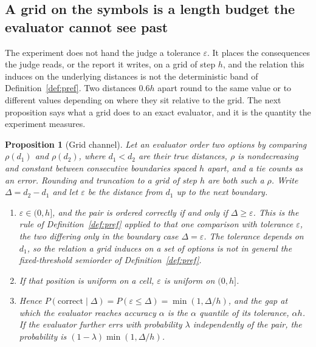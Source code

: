 \documentclass{article}
\newtheorem{proposition}{Proposition}
\theoremstyle{definition}
\theoremstyle{remark}
\begin{document}
\subsection{A grid on the symbols is a length budget the evaluator cannot see past}
\label{sec:channel}

The experiment does not hand the judge a tolerance $\varepsilon$.
It places the consequences the judge reads, or the report it writes, on a grid of step $h$, and the relation this induces on the underlying distances is not the deterministic band of Definition~\ref{def:pref}.
Two distances $0.6h$ apart round to the same value or to different values depending on where they sit relative to the grid.
The next proposition says what a grid does to an exact evaluator, and it is the quantity the experiment measures.

\begin{proposition}[Grid channel]
\label{prop:channel}
Let an evaluator order two options by comparing $\rho(d_{1})$ and $\rho(d_{2})$, where $d_{1}<d_{2}$ are their true distances, $\rho$ is nondecreasing and constant between consecutive boundaries spaced $h$ apart, and a tie counts as an error.
Rounding and truncation to a grid of step $h$ are both such a $\rho$.
Write $\Delta=d_{2}-d_{1}$ and let $\varepsilon$ be the distance from $d_{1}$ up to the next boundary.
\begin{enumerate}
\item[(a)] $\varepsilon\in(0,h]$, and the pair is ordered correctly if and only if $\Delta\ge\varepsilon$. This is the rule of Definition~\ref{def:pref} applied to that one comparison with tolerance $\varepsilon$, the two differing only in the boundary case $\Delta=\varepsilon$. The tolerance depends on $d_{1}$, so the relation a grid induces on a set of options is not in general the fixed-threshold semiorder of Definition~\ref{def:pref}.
\item[(b)] If that position is uniform on a cell, $\varepsilon$ is uniform on $(0,h]$.
\item[(c)] Hence $P(\text{correct}\mid\Delta)=P(\varepsilon\le\Delta)=\min(1,\Delta/h)$, and the gap at which the evaluator reaches accuracy $\alpha$ is the $\alpha$ quantile of its tolerance, $\alpha h$. If the evaluator further errs with probability $\lambda$ independently of the pair, the probability is $(1-\lambda)\min(1,\Delta/h)$.
\end{enumerate}
\end{proposition}
\end{document}

